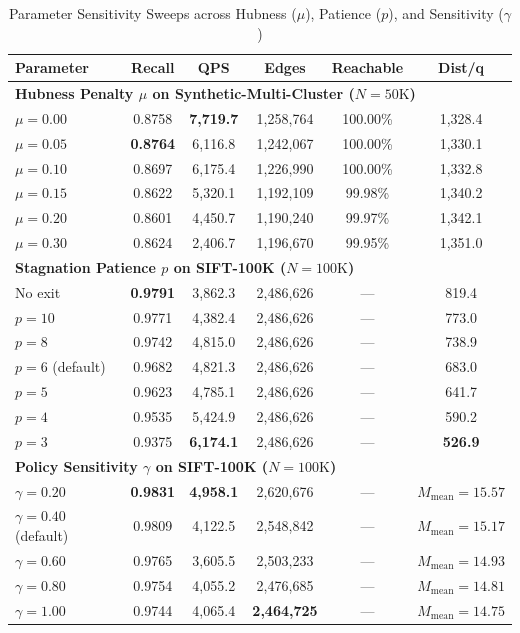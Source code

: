 \documentclass[conference,10pt]{IEEEtran}
\begin{document}
\begin{table}[htbp]
\caption{Parameter Sensitivity Sweeps across Hubness ($\mu$), Patience ($p$), and Sensitivity ($\gamma$)}
\label{tab:sweeps}
\centering
\begin{tabular}{lccccc}
\toprule
\textbf{Parameter} & \textbf{Recall} & \textbf{QPS} & \textbf{Edges} & \textbf{Reachable} & \textbf{Dist/q} \\
\midrule
\multicolumn{6}{l}{\textbf{Hubness Penalty $\mu$ on Synthetic-Multi-Cluster ($N=50\text{K}$)}} \\
$\mu = 0.00$ & 0.8758 & \textbf{7,719.7} & 1,258,764 & 100.00\% & 1,328.4 \\
$\mu = 0.05$ & \textbf{0.8764} & 6,116.8 & 1,242,067 & 100.00\% & 1,330.1 \\
$\mu = 0.10$ & 0.8697 & 6,175.4 & 1,226,990 & 100.00\% & 1,332.8 \\
$\mu = 0.15$ & 0.8622 & 5,320.1 & 1,192,109 & 99.98\% & 1,340.2 \\
$\mu = 0.20$ & 0.8601 & 4,450.7 & 1,190,240 & 99.97\% & 1,342.1 \\
$\mu = 0.30$ & 0.8624 & 2,406.7 & 1,196,670 & 99.95\% & 1,351.0 \\
\midrule
\multicolumn{6}{l}{\textbf{Stagnation Patience $p$ on SIFT-100K ($N=100\text{K}$)}} \\
No exit & \textbf{0.9791} & 3,862.3 & 2,486,626 & --- & 819.4 \\
$p = 10$ & 0.9771 & 4,382.4 & 2,486,626 & --- & 773.0 \\
$p = 8$ & 0.9742 & 4,815.0 & 2,486,626 & --- & 738.9 \\
$p = 6$ (default) & 0.9682 & 4,821.3 & 2,486,626 & --- & 683.0 \\
$p = 5$ & 0.9623 & 4,785.1 & 2,486,626 & --- & 641.7 \\
$p = 4$ & 0.9535 & 5,424.9 & 2,486,626 & --- & 590.2 \\
$p = 3$ & 0.9375 & \textbf{6,174.1} & 2,486,626 & --- & \textbf{526.9} \\
\midrule
\multicolumn{6}{l}{\textbf{Policy Sensitivity $\gamma$ on SIFT-100K ($N=100\text{K}$)}} \\
$\gamma = 0.20$ & \textbf{0.9831} & \textbf{4,958.1} & 2,620,676 & --- & $M_{\text{mean}}=15.57$ \\
$\gamma = 0.40$ (default) & 0.9809 & 4,122.5 & 2,548,842 & --- & $M_{\text{mean}}=15.17$ \\
$\gamma = 0.60$ & 0.9765 & 3,605.5 & 2,503,233 & --- & $M_{\text{mean}}=14.93$ \\
$\gamma = 0.80$ & 0.9754 & 4,055.2 & 2,476,685 & --- & $M_{\text{mean}}=14.81$ \\
$\gamma = 1.00$ & 0.9744 & 4,065.4 & \textbf{2,464,725} & --- & $M_{\text{mean}}=14.75$ \\
\bottomrule
\end{tabular}
\end{table}
\end{document}
